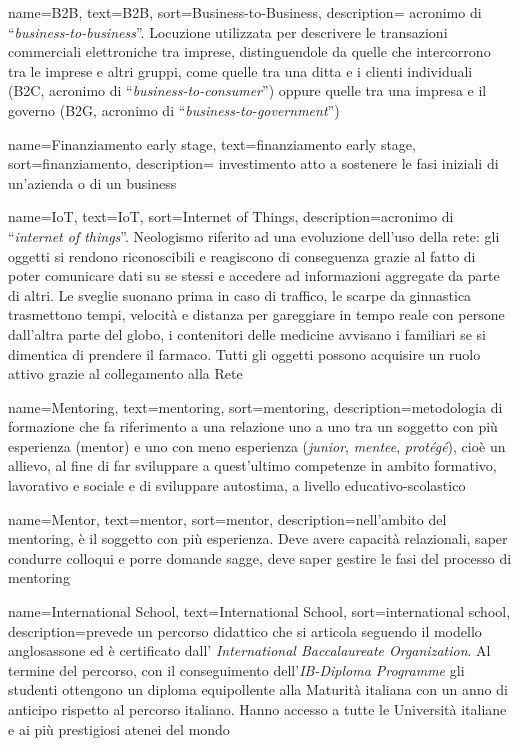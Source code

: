 {
    name=B2B,
    text=B2B,
    sort=Business-to-Business,
    description={ acronimo di “\emph{business-to-business}”. Locuzione utilizzata per descrivere le transazioni commerciali elettroniche tra imprese, distinguendole da quelle che intercorrono tra le imprese e altri gruppi, come quelle tra una ditta e i clienti individuali (B2C, acronimo di “\emph{business-to-consumer}”) oppure quelle tra una impresa e il governo (B2G, acronimo di “\emph{business-to-government}”)}
}

{
    name=Finanziamento early stage,
    text=finanziamento early stage,
    sort=finanziamento,
    description={ investimento atto a sostenere le fasi iniziali di un’azienda o di un business}
}

{
    name=IoT, %
    text=IoT, %
    sort=Internet of Things,
    description={acronimo di “\emph{internet of things}”. Neologismo riferito ad una evoluzione dell'uso della rete: gli oggetti si rendono riconoscibili e reagiscono di conseguenza grazie al fatto di poter comunicare dati su se stessi e accedere ad informazioni aggregate da parte di altri. Le sveglie suonano prima in caso di traffico, le scarpe da ginnastica trasmettono tempi, velocità e distanza per gareggiare in tempo reale con persone dall'altra parte del globo, i contenitori delle medicine avvisano i familiari se si dimentica di prendere il farmaco. 
Tutti gli oggetti possono acquisire un ruolo attivo grazie al collegamento alla Rete}
}

{
    name=Mentoring, %
    text=mentoring, %
    sort=mentoring,
    description={metodologia di formazione che fa riferimento a una relazione uno a uno tra un soggetto con più esperienza (mentor) e uno con meno esperienza (\emph{junior}, \emph{mentee}, \emph{protégé}), cioè un allievo, al fine di far sviluppare a quest'ultimo competenze in ambito formativo, lavorativo e sociale e di sviluppare autostima, a livello educativo-scolastico}
}

{
    name=Mentor, %
    text=mentor, %
    sort=mentor,
    description={nell’ambito del mentoring, è il soggetto con più esperienza. Deve avere capacità relazionali, saper condurre colloqui e porre domande sagge, deve saper gestire le fasi del processo di mentoring}
}

{
    name=International School, %
    text=International School, %
    sort=international school,
    description={prevede un percorso didattico che si articola seguendo il modello anglosassone ed è certificato dall' \emph{International Baccalaureate Organization}. 
Al termine del percorso, con il conseguimento dell'\emph{IB-Diploma Programme} gli studenti ottengono un diploma equipollente alla Maturità italiana con un anno di anticipo rispetto al percorso italiano. Hanno accesso a tutte le Università italiane e ai più prestigiosi atenei del mondo}
}

